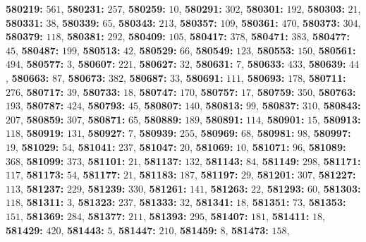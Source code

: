 \textsf{\bfseries 580219:} $561$, \textsf{\bfseries 580231:} $257$, \textsf{\bfseries 580259:} $10$, \textsf{\bfseries 580291:} $302$, \textsf{\bfseries 580301:} $192$, \textsf{\bfseries 580303:} $21$, \textsf{\bfseries 580331:} $38$, \textsf{\bfseries 580339:} $65$, \textsf{\bfseries 580343:} $213$, \textsf{\bfseries 580357:} $109$, \textsf{\bfseries 580361:} $470$, \textsf{\bfseries 580373:} $304$, \textsf{\bfseries 580379:} $118$, \textsf{\bfseries 580381:} $292$, \textsf{\bfseries 580409:} $105$, \textsf{\bfseries 580417:} $378$, \textsf{\bfseries 580471:} $383$, \textsf{\bfseries 580477:} $45$, \textsf{\bfseries 580487:} $199$, \textsf{\bfseries 580513:} $42$, \textsf{\bfseries 580529:} $66$, \textsf{\bfseries 580549:} $123$, \textsf{\bfseries 580553:} $150$, \textsf{\bfseries 580561:} $494$, \textsf{\bfseries 580577:} $3$, \textsf{\bfseries 580607:} $221$, \textsf{\bfseries 580627:} $32$, \textsf{\bfseries 580631:} $7$, \textsf{\bfseries 580633:} $433$, \textsf{\bfseries 580639:} $44$, \textsf{\bfseries 580663:} $87$, \textsf{\bfseries 580673:} $382$, \textsf{\bfseries 580687:} $33$, \textsf{\bfseries 580691:} $111$, \textsf{\bfseries 580693:} $178$, \textsf{\bfseries 580711:} $276$, \textsf{\bfseries 580717:} $39$, \textsf{\bfseries 580733:} $18$, \textsf{\bfseries 580747:} $170$, \textsf{\bfseries 580757:} $17$, \textsf{\bfseries 580759:} $350$, \textsf{\bfseries 580763:} $193$, \textsf{\bfseries 580787:} $424$, \textsf{\bfseries 580793:} $45$, \textsf{\bfseries 580807:} $140$, \textsf{\bfseries 580813:} $99$, \textsf{\bfseries 580837:} $310$, \textsf{\bfseries 580843:} $207$, \textsf{\bfseries 580859:} $307$, \textsf{\bfseries 580871:} $65$, \textsf{\bfseries 580889:} $189$, \textsf{\bfseries 580891:} $114$, \textsf{\bfseries 580901:} $15$, \textsf{\bfseries 580913:} $118$, \textsf{\bfseries 580919:} $131$, \textsf{\bfseries 580927:} $7$, \textsf{\bfseries 580939:} $255$, \textsf{\bfseries 580969:} $68$, \textsf{\bfseries 580981:} $98$, \textsf{\bfseries 580997:} $19$, \textsf{\bfseries 581029:} $54$, \textsf{\bfseries 581041:} $237$, \textsf{\bfseries 581047:} $20$, \textsf{\bfseries 581069:} $10$, \textsf{\bfseries 581071:} $96$, \textsf{\bfseries 581089:} $368$, \textsf{\bfseries 581099:} $373$, \textsf{\bfseries 581101:} $21$, \textsf{\bfseries 581137:} $132$, \textsf{\bfseries 581143:} $84$, \textsf{\bfseries 581149:} $298$, \textsf{\bfseries 581171:} $117$, \textsf{\bfseries 581173:} $54$, \textsf{\bfseries 581177:} $21$, \textsf{\bfseries 581183:} $187$, \textsf{\bfseries 581197:} $29$, \textsf{\bfseries 581201:} $307$, \textsf{\bfseries 581227:} $113$, \textsf{\bfseries 581237:} $229$, \textsf{\bfseries 581239:} $330$, \textsf{\bfseries 581261:} $141$, \textsf{\bfseries 581263:} $22$, \textsf{\bfseries 581293:} $60$, \textsf{\bfseries 581303:} $118$, \textsf{\bfseries 581311:} $3$, \textsf{\bfseries 581323:} $237$, \textsf{\bfseries 581333:} $32$, \textsf{\bfseries 581341:} $18$, \textsf{\bfseries 581351:} $73$, \textsf{\bfseries 581353:} $151$, \textsf{\bfseries 581369:} $284$, \textsf{\bfseries 581377:} $211$, \textsf{\bfseries 581393:} $295$, \textsf{\bfseries 581407:} $181$, \textsf{\bfseries 581411:} $18$, \textsf{\bfseries 581429:} $420$, \textsf{\bfseries 581443:} $5$, \textsf{\bfseries 581447:} $210$, \textsf{\bfseries 581459:} $8$, \textsf{\bfseries 581473:} $158$, 

